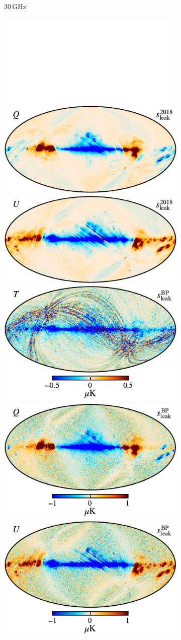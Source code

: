 \documentclass[twocolumn]{aa}
\newcommand{\?}[1]{\textcolor{red}{{\bf [#1]}}}
\begin{document}
\begin{figure}[p]
\begin{subfigure}[t]{\linewidth}
      \caption{30\,GHz}
      \vspace*{3mm}
    \end{subfigure}
    \begin{subfigure}[t]{\linewidth}
      \includegraphics[width=0.32\linewidth]{figs/whitemap.pdf}
      \includegraphics[width=0.32\linewidth]{figs/tod_044_bpcorr_DPC_Q_STOKES_w8_n1024_60arcmin_c-planck.pdf}
      \includegraphics[width=0.32\linewidth]{figs/tod_044_bpcorr_DPC_U_STOKES_w8_n1024_60arcmin_c-planck.pdf}\\
      \includegraphics[width=0.32\linewidth]{figs/tod_044_bpcorr_c0001_k000251_I_Stokes_w8_n512_60arcmin_cb_c-planck.pdf}
      \includegraphics[width=0.32\linewidth]{figs/tod_044_bpcorr_c0001_k000251_Q_Stokes_w8_n512_60arcmin_cb_c-planck.pdf}
      \includegraphics[width=0.32\linewidth]{figs/tod_044_bpcorr_c0001_k000251_U_Stokes_w8_n512_60arcmin_cb_c-planck.pdf}

\end{subfigure}
\end{figure}
\end{document}
